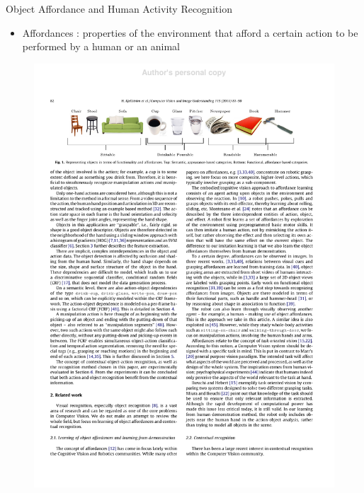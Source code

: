 \documentclass{beamer}
\begin{document}
\begin{frame}{ Object Affordance and Human Activity Recognition}
\begin{itemize}
\item Affordances :  properties of the environment that afford a certain action to be performed by a human or an animal
\end{itemize}
\begin{figure}[t!]
\includegraphics[width=.95\linewidth]{affordances.pdf}
\end{figure}
\end{frame}
\end{document}
